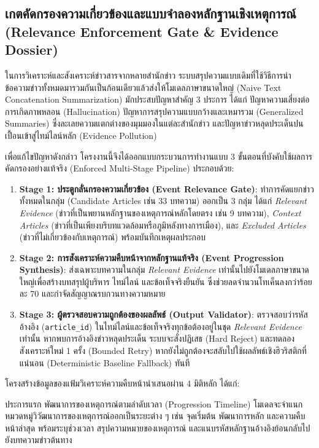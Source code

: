 \subsection{เกตคัดกรองความเกี่ยวข้องและแบบจำลองหลักฐานเชิงเหตุการณ์ (Relevance Enforcement Gate \& Evidence Dossier)}

ในการวิเคราะห์และสังเคราะห์ข่าวสารจากหลายสำนักข่าว ระบบสรุปความแบบเดิมที่ใช้วิธีการนำข้อความข่าวทั้งหมดมารวมกันเป็นก้อนเดียวแล้วส่งให้โมเดลภาษาขนาดใหญ่ (Naive Text Concatenation Summarization) มักประสบปัญหาสำคัญ 3 ประการ ได้แก่ ปัญหาความเสี่ยงต่อการเกิดภาพหลอน (Hallucination) ปัญหาการสรุปความแบบกว้างและเหมารวม (Generalized Summaries) ซึ่งละเลยความแตกต่างของมุมมองในแต่ละสำนักข่าว และปัญหาข่าวหลุดประเด็นปนเปื้อนเข้าสู่ไทม์ไลน์หลัก (Evidence Pollution)

เพื่อแก้ไขปัญหาดังกล่าว โครงงานนี้จึงได้ออกแบบกระบวนการทำงานแบบ 3 ขั้นตอนที่บังคับใช้ผลการคัดกรองอย่างแท้จริง (Enforced Multi-Stage Pipeline) ประกอบด้วย:

\begin{enumerate}
    \item \textbf{Stage 1: ประตูกลั่นกรองความเกี่ยวข้อง (Event Relevance Gate)}:
    ทำการคัดแยกข่าวทั้งหมดในกลุ่ม (Candidate Articles เช่น 33 บทความ) ออกเป็น 3 กลุ่ม ได้แก่ \textit{Relevant Evidence} (ข่าวที่เป็นพยานหลักฐานของเหตุการณ์หลักโดยตรง เช่น 9 บทความ), \textit{Context Articles} (ข่าวที่เป็นเพียงบริบทแวดล้อมหรือภูมิหลังทางการเมือง), และ \textit{Excluded Articles} (ข่าวที่ไม่เกี่ยวข้องกับเหตุการณ์) พร้อมบันทึกเหตุผลประกอบ
    \item \textbf{Stage 2: การสังเคราะห์ความคืบหน้าจากหลักฐานแท้จริง (Event Progression Synthesis)}:
    ส่งเฉพาะบทความในกลุ่ม \textit{Relevant Evidence} เท่านั้นไปยังโมเดลภาษาขนาดใหญ่เพื่อสร้างบทสรุปผู้บริหาร ไทม์ไลน์ และข้อเท็จจริงยืนยัน ซึ่งช่วยลดจำนวนโทเค็นลงกว่าร้อยละ 70 และกำจัดสัญญาณรบกวนทางความหมาย
    \item \textbf{Stage 3: ผู้ตรวจสอบความถูกต้องของผลลัพธ์ (Output Validator)}:
    ตรวจสอบว่ารหัสอ้างอิง (\texttt{article\_id}) ในไทม์ไลน์และข้อเท็จจริงทุกข้อต้องอยู่ในชุด \textit{Relevant Evidence} เท่านั้น หากพบการอ้างอิงข่าวหลุดประเด็น ระบบจะสั่งปฏิเสธ (Hard Reject) และทดลองสังเคราะห์ใหม่ 1 ครั้ง (Bounded Retry) หากยังไม่ถูกต้องจะสลับไปใช้ผลลัพธ์เชิงฮิวริสติกที่แน่นอน (Deterministic Baseline Fallback) ทันที
\end{enumerate}

โครงสร้างข้อมูลของแฟ้มวิเคราะห์ความคืบหน้านำเสนอผ่าน 4 มิติหลัก ได้แก่:

ประการแรก พัฒนาการของเหตุการณ์ตามลำดับเวลา (Progression Timeline) โมเดลจะจำแนกหมวดหมู่วิวัฒนาการของเหตุการณ์ออกเป็นระยะต่าง ๆ เช่น จุดเริ่มต้น พัฒนาการหลัก และความคืบหน้าล่าสุด พร้อมระบุช่วงเวลา สรุปความหมายของเหตุการณ์ และแนบรหัสหลักฐานอ้างอิงย้อนกลับไปยังบทความข่าวต้นทาง

